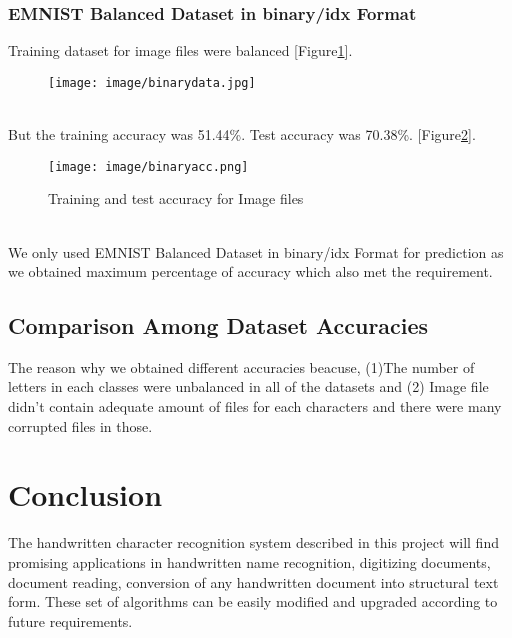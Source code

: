 \documentclass[conference]{IEEEtran}
\begin{document}
\subsubsection{EMNIST Balanced Dataset in binary/idx Format}
Training dataset for image files were balanced [Figure\ref{bindataa}].
\begin{figure}[htp]
    \centering
    \texttt{[image: image/binarydata.jpg]}
    \caption{ }
    \label{bindataa}
\end{figure}\\
But the training accuracy was 51.44\%. Test accuracy was 70.38\%.
[Figure\ref{binacc}].
\begin{figure}[htp]
    \centering
    \texttt{[image: image/binaryacc.png]}
    \caption{Training and test accuracy for Image files}
    \label{binacc}
\end{figure}\\
We only used EMNIST Balanced Dataset in binary/idx Format for prediction as we obtained maximum percentage of accuracy which also met the requirement.
\subsection{Comparison Among Dataset Accuracies}
The reason why we obtained different accuracies beacuse, (1)The number of letters in each classes were unbalanced in all of the datasets and (2) Image file didn't contain adequate amount of files for each characters and there were many corrupted files in those.
\section{Conclusion}
The handwritten character recognition system described in 
this project will find promising applications in 
handwritten name recognition, digitizing documents, document reading, 
conversion of any handwritten document into 
structural text form. These set of algorithms can be easily modified and upgraded according to future requirements.









\end{document}
